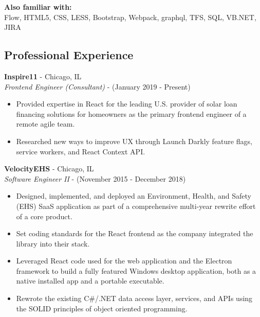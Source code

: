 \documentclass[12pt]{article}
\begin{document}
\begin{paracol}{2}
\noindent \textbf{Also familiar with:}\\
Flow, HTML5, CSS, LESS, Bootstrap, Webpack, graphql, TFS, SQL, VB.NET, JIRA

\switchcolumn 

\subsection*{Professional Experience} 

\textbf{Inspire11} - Chicago, IL \\
\textit{Frontend Engineer (Consultant)} - {\footnotesize{(January 2019 - Present)}} 
\begin{itemize}
    \setlength\itemsep{0.1em}
    \item{\footnotesize{Provided expertise in React for the leading U.S. provider of solar loan financing solutions for homeowners as the primary frontend engineer of a remote agile team.}}
    \item {\footnotesize{Researched new ways to improve UX through Launch Darkly feature flags, service workers, and React Context API.}}
\end{itemize} 

\noindent \textbf{VelocityEHS} - Chicago, IL \\
\textit{Software Engineer II} - {\footnotesize{(November 2015 - December 2018)}}
\begin{itemize}
    \setlength\itemsep{0.1em}
    \item {\footnotesize{Designed, implemented, and deployed an Environment, Health, and Safety (EHS) SaaS application as part of a comprehensive multi-year rewrite effort of a core product.}}
    \item {\footnotesize{Set coding standards for the React frontend as the company integrated the library into their stack.}}
    \item {\footnotesize{Leveraged React code used for the web application and the Electron framework to build a fully featured Windows desktop application, both as a native installed app and a portable executable.}}
    \item {\footnotesize{Rewrote the existing C\#/.NET data access layer, services, and APIs using the SOLID principles of object oriented programming.}}
\end{itemize} 


\end{paracol}
\end{document}

